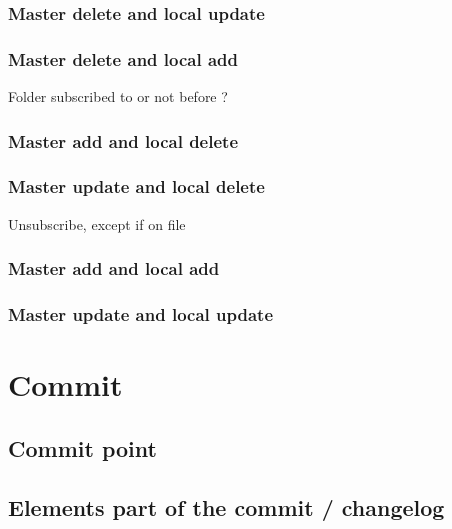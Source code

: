 \documentclass[10pt,a4paper]{article}
\begin{document}
\subsubsection{Master delete and local update}
\label{delupd}

\subsubsection{Master delete and local add}
\label{deladd}

Folder subscribed to or not before ?

\subsubsection{Master add and local delete}
\label{adddel}

\subsubsection{Master update and local delete}
\label{upddel}

Unsubscribe, except if on file

\subsubsection{Master add and local add}
\label{addadd}

\subsubsection{Master update and local update}
\label{updupd}

\section{Commit}

\subsection{Commit point}

\subsection{Elements part of the commit / changelog}
\end{document}

